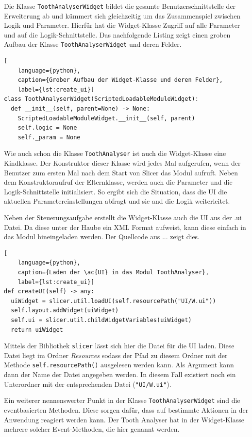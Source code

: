 Die Klasse \texttt{ToothAnalyserWidget} bildet die gesamte Benutzerschnittstelle
der Erweiterung ab und kümmert sich gleichzeitig um das Zusammenspiel zwischen Logik
und Parameter. Hierfür hat die Widget-Klasse Zugriff auf alle Parameter und auf
die Logik-Schnittstelle. Das nachfolgende Listing zeigt einen groben Aufbau der Klasse
\texttt{ToothAnalyserWidget} und deren Felder.

\begin{lstlisting}[
    language={python},
    caption={Grober Aufbau der Widget-Klasse und deren Felder},
    label={lst:create_ui}]
class ToothAnalyserWidget(ScriptedLoadableModuleWidget):
  def __init__(self, parent=None) -> None:
    ScriptedLoadableModuleWidget.__init__(self, parent)
    self.logic = None
    self._param = None
\end{lstlisting}

Wie auch schon die Klasse \texttt{ToothAnalyser} ist auch die Widget-Klasse eine
Kindklasse. Der Konstruktor dieser Klasse wird jedes Mal aufgerufen, wenn der
Benutzer zum ersten Mal nach dem Start von Slicer das Modul aufruft. Neben dem Konstruktoraufruf
der Elternklasse, werden auch die Parameter und die Logik-Schnittstelle
initialisiert. So ergibt sich die Situation, dass die UI die aktuellen
Parametereinstellungen abfragt und sie and die Logik weiterleitet.

Neben der Steuerungsaufgabe erstellt die Widget-Klasse auch die UI aus der .ui Datei.
Da diese unter der Haube ein XML Format aufweist, kann diese einfach in das Modul
hineingeladen werden. Der Quellcode aus ... zeigt dies.

\begin{lstlisting}[
    language={python},
    caption={Laden der \ac{UI} in das Modul ToothAnalyser},
    label={lst:create_ui}]
def createUI(self) -> any:
  uiWidget = slicer.util.loadUI(self.resourcePath("UI/W.ui"))
  self.layout.addWidget(uiWidget)
  self.ui = slicer.util.childWidgetVariables(uiWidget)
  return uiWidget
\end{lstlisting}

Mittels der Bibliothek \texttt{slicer} lässt sich hier die Datei für die \ac{UI}
laden. Diese Datei liegt im Ordner \textit{Resources} sodass der Pfad zu diesem Ordner
mit der Methode \texttt{self.resourcePath()} ausgelesen werden kann. Als Argument
kann dann der Name der Datei angegeben werden. In diesem Fall existiert noch ein
Unterordner mit der entsprechenden Datei (\texttt{"UI/W.ui"}).

Ein weiterer nennenswerter Punkt in der Klasse \texttt{ToothAnalyserWidget} sind
die eventbasierten Methoden. Diese sorgen dafür, dass auf bestimmte Aktionen in
der Anwendung reagiert werden kann. Der Tooth Analyser hat in der Widget-Klasse mehrere
solcher Event-Methoden, die hier genannt werden.

